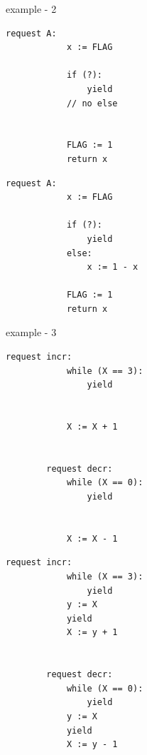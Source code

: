 





\vspace{2em}
example - 2

\noindent
\begin{minipage}[t]{0.45\textwidth}
	\begin{lstlisting}[caption={Not serializable: {(A,0),(A,0)}}]
		request A: 
		    x := FLAG 
		
		    if (?): 
		        yield
		    // no else
		
		
		    FLAG := 1 
		    return x
	\end{lstlisting}
\end{minipage}%
\hfill
\begin{minipage}[t]{0.45\textwidth}
	\begin{lstlisting}[caption={Serializable}]
		request A: 
		    x := FLAG
		
		    if (?):
		        yield
		    else:
		        x := 1 - x
		
		    FLAG := 1
		    return x
	\end{lstlisting}
\end{minipage}

\vspace{2em}
example - 3

\noindent
\begin{minipage}[t]{0.45\textwidth}
	\begin{lstlisting}[caption={Fred (serializable)}]
		request incr: 
		    while (X == 3):
		        yield
		        
		        
		    X := X + 1
		
		
		request decr: 
		    while (X == 0): 
		        yield
		        
		        
		    X := X - 1
	\end{lstlisting}
\end{minipage}
\hfill
\begin{minipage}[t]{0.45\textwidth}
	\begin{lstlisting}[caption={Fred2 (not serializable)}]
		request incr:
		    while (X == 3):
		        yield
		    y := X
		    yield
		    X := y + 1
		
		
		request decr: 
		    while (X == 0):
		        yield
		    y := X
		    yield
		    X := y - 1
	\end{lstlisting}
\end{minipage}
	
